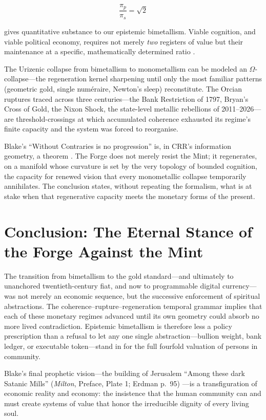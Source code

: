 \documentclass[
]{article}
\begin{document}
\[\frac{\pi_p}{\pi_s} = \sqrt{2}\]

gives quantitative substance to our epistemic bimetallism. Viable
cognition, and viable political economy, requires not merely \emph{two}
registers of value but their maintenance at a specific, mathematically
determined ratio \citep{sabine2026doors, friston2010free}.

The Urizenic collapse from bimetallism to monometallism can be modeled
an \(\Omega\)-collapse---the regeneration kernel sharpening until only
the most familiar patterns (geometric gold, single numéraire, Newton's
sleep) reconstitute. The Orcian ruptures traced across three
centuries---the Bank Restriction of 1797, Bryan's Cross of Gold, the
Nixon Shock, the state-level metallic rebellions of 2011--2026---are
threshold-crossings at which accumulated coherence exhausted its
regime's finite capacity and the system was forced to reorganise.

Blake's ``Without Contraries is no progression'' is, in CRR's
information geometry, a theorem \citep{blake1790marriage}. The Forge
does not merely resist the Mint; it regenerates, on a manifold whose
curvature is set by the very topology of bounded cognition, the capacity
for renewed vision that every monometallic collapse temporarily
annihilates. The conclusion states, without repeating the formalism,
what is at stake when that regenerative capacity meets the monetary
forms of the present.

\newpage

\section{Conclusion: The Eternal Stance of the Forge Against the
Mint}\label{conclusion-the-eternal-stance-of-the-forge-against-the-mint}

The transition from bimetallism to the gold standard---and ultimately to
unanchored twentieth-century fiat, and now to programmable digital
currency---was not merely an economic sequence, but the successive
enforcement of spiritual abstractions. The
coherence--rupture--regeneration temporal grammar implies that each of
these monetary regimes advanced until its own geometry could absorb no
more lived contradiction. Epistemic bimetallism is therefore less a
policy prescription than a refusal to let any one single
abstraction---bullion weight, bank ledger, or executable token---stand
in for the full fourfold valuation of persons in community.

Blake's final prophetic vision---the building of Jerusalem ``Among these
dark Satanic Mills'' (\emph{Milton}, Preface, Plate 1; Erdman p.~95)
\citep{erdman1988complete}---is a transfiguration of economic reality
and economy: the insistence that the human community can and must create
systems of value that honor the irreducible dignity of every living
soul.
\end{document}
